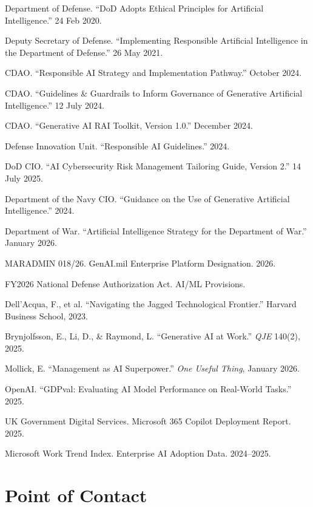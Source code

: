 \documentclass[11pt,letterpaper]{article}
\begin{document}
\begin{enumerate}[label={[\arabic*]},leftmargin=2em]
  \item Department of Defense. ``DoD Adopts Ethical Principles for Artificial Intelligence.'' 24 Feb 2020.
  \item Deputy Secretary of Defense. ``Implementing Responsible Artificial Intelligence in the Department of Defense.'' 26 May 2021.
  \item CDAO. ``Responsible AI Strategy and Implementation Pathway.'' October 2024.
  \item CDAO. ``Guidelines \& Guardrails to Inform Governance of Generative Artificial Intelligence.'' 12 July 2024.
  \item CDAO. ``Generative AI RAI Toolkit, Version 1.0.'' December 2024.
  \item Defense Innovation Unit. ``Responsible AI Guidelines.'' 2024.
  \item DoD CIO. ``AI Cybersecurity Risk Management Tailoring Guide, Version 2.'' 14 July 2025.
  \item Department of the Navy CIO. ``Guidance on the Use of Generative Artificial Intelligence.'' 2024.
  \item Department of War. ``Artificial Intelligence Strategy for the Department of War.'' January 2026.
  \item MARADMIN 018/26. GenAI.mil Enterprise Platform Designation. 2026.
  \item FY2026 National Defense Authorization Act. AI/ML Provisions.
  \item Dell'Acqua, F., et al. ``Navigating the Jagged Technological Frontier.'' Harvard Business School, 2023.
  \item Brynjolfsson, E., Li, D., \& Raymond, L. ``Generative AI at Work.'' \emph{QJE} 140(2), 2025.
  \item Mollick, E. ``Management as AI Superpower.'' \emph{One Useful Thing}, January 2026.
  \item OpenAI. ``GDPval: Evaluating AI Model Performance on Real-World Tasks.'' 2025.
  \item UK Government Digital Services. Microsoft 365 Copilot Deployment Report. 2025.
  \item Microsoft Work Trend Index. Enterprise AI Adoption Data. 2024--2025.
\end{enumerate}

\section*{Point of Contact}
\end{document}
